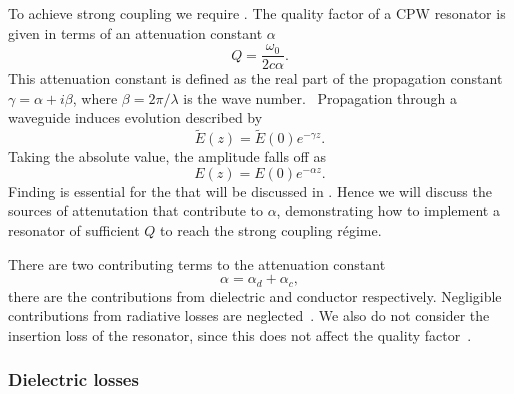 To achieve strong coupling we require . The quality factor of a
CPW resonator is given in terms of an attenuation constant
$\alpha$~\cite{Simons2004}
%
\begin{equation}
  Q = \frac{\omega_0}{2c\alpha}.
  \label{mws:eqn:Qalpha}
\end{equation}
%
This attenuation constant is defined as the real part of the propagation
constant $\gamma = \alpha + i\beta$, where $\beta = 2\pi / \lambda$ is the wave
number.~\cite{Simons2004} Propagation through a waveguide induces evolution
described by
%
\begin{equation}
  \widetilde{E}(z) = \widetilde{E}(0)e^{-\gamma z}.
  \label{mws:eqn:Eloss}
\end{equation}
%
Taking the absolute value, the amplitude falls off as
%
\begin{equation}
  E(z) = E(0)e^{-\alpha z}.
\end{equation}
%
Finding  is essential
for the  that will be discussed in . Hence we will discuss the sources of attenutation that contribute to
$\alpha$, demonstrating how to implement a resonator of sufficient $Q$ to reach
the strong coupling r\'egime.

There are two contributing terms to the attenuation constant
%
\begin{equation}
  \alpha = \alpha_d + \alpha_c,
\end{equation}
%
there are the contributions from dielectric and conductor respectively.
Negligible contributions from radiative losses are
neglected~\cite{Frankel1991}. We also do not consider the insertion loss of the
resonator, since this does not affect the quality
factor~\cite{doi:10.1063/1.3010859}.


\subsubsection{Dielectric losses}

